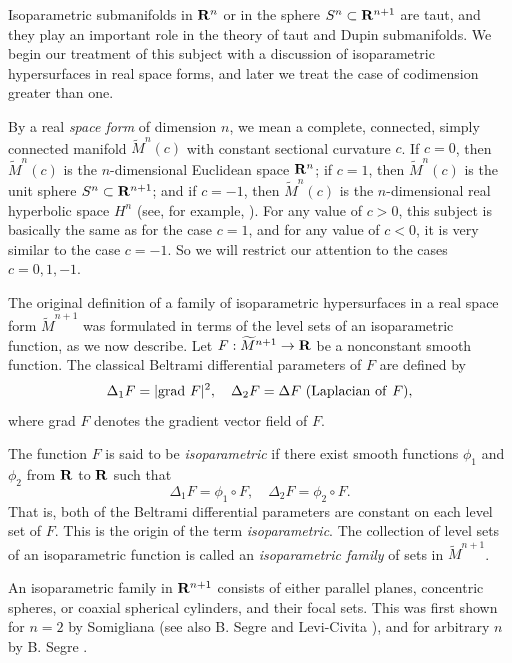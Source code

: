\documentclass[12pt]{article}
\begin{document}
Isoparametric submanifolds in ${\bf R}^n$ or in the sphere $S^n \subset {\bf R}^{n+1}$ are taut, and they play an important role in the theory of taut  and Dupin submanifolds.  We begin our treatment of this subject with a discussion of isoparametric hypersurfaces in real space forms, and later we
treat the case of codimension greater than one.

By a real {\em space form}
of dimension $n$, we mean a complete, connected, simply connected manifold $\widetilde{M}^n (c)$ with constant sectional curvature $c$.  If $c=0$, then $\widetilde{M}^n (c)$ is the $n$-dimensional Euclidean space ${\bf R}^n$; if
$c=1$, then $\widetilde{M}^n (c)$ is the unit sphere $S^n \subset {\bf R}^{n+1}$; and if $c= -1$, then $\widetilde{M}^n (c)$ is the $n$-dimensional real hyperbolic space $H^n$ (see, for example, \cite[Vol. I, pp. 204--209]{KN}).  For any value of $c>0$, this subject is basically the same as for the case $c=1$, and for any value of $c<0$, it is very similar to the case $c=-1$.  So we will restrict our attention to the cases $c = 0, 1, -1$.


The original definition of a family of isoparametric hypersurfaces in a real space
form $\widetilde{M}^{n+1}$ was formulated in terms of the level sets of an isoparametric function, as we now describe. 
Let $F:\widetilde{M}^{n+1} \rightarrow {\bf R}$ be a nonconstant smooth function. The classical Beltrami
differential parameters of $F$ are defined by
\begin{equation}
\label{eq:1-beltrami}
\Delta_1 F = |{\rm grad}\  F|^2, \quad \Delta_2 F = \Delta F\ ({\rm Laplacian}\ {\rm of}\  F),
\end{equation}
where grad $F$ denotes the gradient vector field of $F$.

The function $F$ is said to be {\em isoparametric} if there exist smooth functions $\phi_1$ and $\phi_2$ from ${\bf R}$ to 
${\bf R}$ such that
\begin{equation}
\label{eq:1-beltrami-isoparametric}
\Delta_1 F = \phi_1 \circ F, \quad \Delta_2 F = \phi_2 \circ F.
\end{equation}
That is, both of the Beltrami differential parameters are constant on each level set of $F$. This is the origin of the 
term {\em isoparametric}.
The collection of level sets of an isoparametric function is called an {\em isoparametric family} of sets in
$\widetilde{M}^{n+1}$.


An isoparametric family in ${\bf R}^{n+1}$ consists of either
parallel planes, concentric spheres, or coaxial spherical cylinders,
and their focal sets.
This was first shown for $n=2$ by Somigliana \cite{Som} 
(see also B. Segre \cite{Seg1} and Levi-Civita  \cite{Lev}), and for arbitrary $n$ by B. Segre \cite{Seg}.
\end{document}
